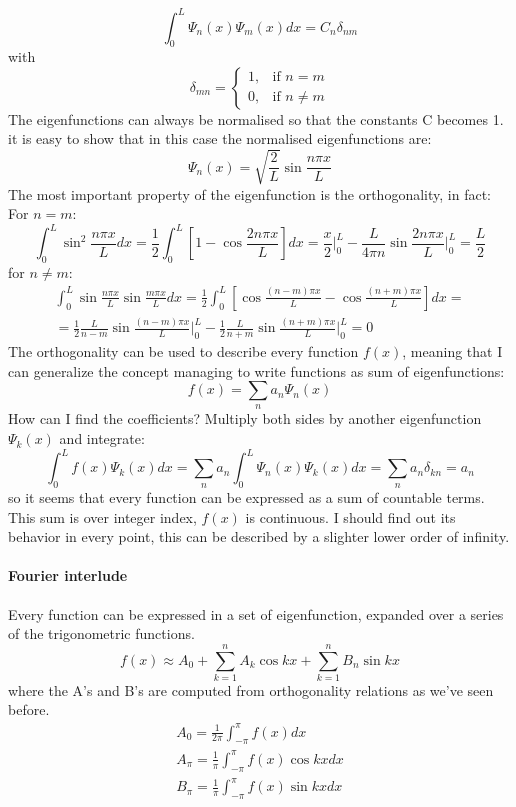 \begin{equation}
	\int_0^L\Psi_n(x)\Psi_m(x)dx=C_n\delta_{nm}
\end{equation}
with $$\delta_{mn}=\begin{cases}
		1 , & \text{if $n=m$}    \\
		0,  & \text{if $n\ne m$}
	\end{cases}$$
The eigenfunctions can always be normalised so that the constants C becomes 1. it is easy to show that in this case the normalised eigenfunctions are:
\begin{equation}
	\Psi_n(x)=\sqrt{\frac{2}{L}}\sin\frac{n\pi x}{L}
\end{equation}
The most important property of the eigenfunction is the
orthogonality, in fact:
For $n=m$:
$$\int_0^L\sin^2\frac{n\pi x}{L}dx=\frac{1}{2}\int_0^L\left[1-\cos\frac{2n\pi x}{L}\right]dx=\frac{x}{2}\bigg|_0^L-\frac{L}{4\pi n}\sin\frac{2n\pi x}{L}\bigg|_0^L=\frac{L}{2}$$
for $n\ne m$:
\begin{equation*}
	\begin{split}
		\int_0^L\sin\frac{n\pi x}{L}\sin\frac{m\pi x}{L}dx=\frac{1}{2}\int_0^L\left[\cos\frac{(n-m)\pi x}{L}-\cos\frac{(n+m)\pi x}{L}\right]dx= \\
		=\frac{1}{2}\frac{L}{n-m}\sin\frac{(n-m)\pi x}{L}\bigg|_0^L-\frac{1}{2}\frac{L}{n+m}\sin\frac{(n+m)\pi x}{L}\bigg|_0^L=0
	\end{split}
\end{equation*}
The orthogonality can be used to describe every function $f(x)$, meaning that I can generalize the concept managing to write functions as sum of eigenfunctions:
$$f(x)=\displaystyle\sum_na_n\Psi_n(x)$$
How can I find the coefficients? Multiply both sides by another
eigenfunction $\Psi_k(x)$ and integrate:
$$\int_0^Lf(x)\Psi_k(x)dx=\displaystyle\sum_na_n\int_0^L\Psi_n(x)\Psi_k(x)dx=\displaystyle\sum_na_n\delta_{kn}=a_n$$
so it seems that every function can be expressed as a sum of countable terms. This sum is over integer index, $f(x)$ is continuous. I should find out its behavior in every point, this can be described by a slighter lower order of infinity.
\paragraph{Fourier interlude} Every function can be expressed in a set of eigenfunction, expanded over a series of the trigonometric functions.
\begin{equation}
	f(x)\approx A_0+\displaystyle\sum_{k=1}^nA_k\cos kx+\sum_{k=1}^nB_n\sin kx
\end{equation}
where the A's and B's are computed from orthogonality relations as we've seen before.
\begin{align*}
	A_0=\frac{1}{2\pi}\int_{-\pi}^{\pi}f(x)dx           \\
	A_{\pi}=\frac{1}{\pi}\int_{-\pi}^{\pi}f(x)\cos kxdx \\
	B_{\pi}=\frac{1}{\pi}\int_{-\pi}^{\pi} f(x)\sin kx dx
\end{align*}

